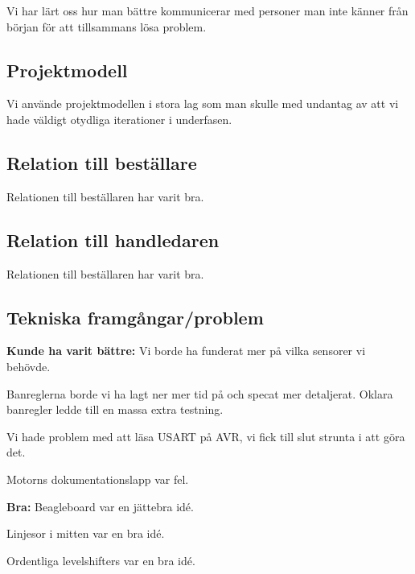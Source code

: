 Vi har lärt oss hur man bättre kommunicerar med personer man inte känner från början för att tillsammans lösa problem.
\newline

\subsection{Projektmodell}

Vi använde projektmodellen i stora lag som man skulle med undantag av att vi hade väldigt otydliga iterationer i underfasen.

\subsection{Relation till beställare}

Relationen till beställaren har varit bra.

\subsection{Relation till handledaren}

Relationen till beställaren har varit bra.

\subsection{Tekniska framgångar/problem}

\textbf{Kunde ha varit bättre:}
\newline
Vi borde ha funderat mer på vilka sensorer vi behövde.
\newline

Banreglerna borde vi ha lagt ner mer tid på och specat mer detaljerat. Oklara banregler ledde till en massa extra testning.
\newline

Vi hade problem med att läsa USART på AVR, vi fick till slut strunta i att göra det.
\newline

Motorns dokumentationslapp var fel.
\newline

\textbf{Bra:}
\newline
Beagleboard var en jättebra idé.
\newline

Linjesor i mitten var en bra idé.
\newline

Ordentliga levelshifters var en bra idé.